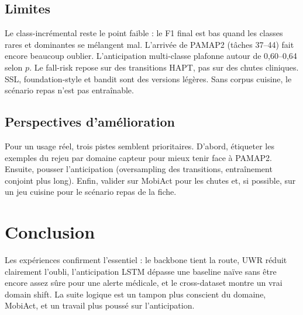 \subsection{Limites}

Le class-incrémental reste le point faible : le F1 final est bas quand les
classes rares et dominantes se mélangent mal. L'arrivée de PAMAP2 (tâches
37--44) fait encore beaucoup oublier. L'anticipation multi-classe plafonne
autour de 0,60--0,64 selon $p$. Le fall-risk repose sur des transitions
HAPT, pas sur des chutes cliniques. SSL, foundation-style et bandit sont des
versions légères. Sans corpus cuisine, le scénario repas n'est pas entraînable.

\subsection{Perspectives d'amélioration}

Pour un usage réel, trois pistes semblent prioritaires. D'abord, étiqueter
les exemples du rejeu par domaine capteur pour mieux tenir face à PAMAP2.
Ensuite, pousser l'anticipation (oversampling des transitions, entraînement
conjoint plus long). Enfin, valider sur MobiAct pour les chutes et, si
possible, sur un jeu cuisine pour le scénario repas de la fiche.

\section{Conclusion}

Les expériences confirment l'essentiel : le backbone tient la route, UWR
réduit clairement l'oubli, l'anticipation LSTM dépasse une baseline naïve
sans être encore assez sûre pour une alerte médicale, et le cross-dataset
montre un vrai domain shift. La suite logique est un tampon plus conscient
du domaine, MobiAct, et un travail plus poussé sur l'anticipation.

